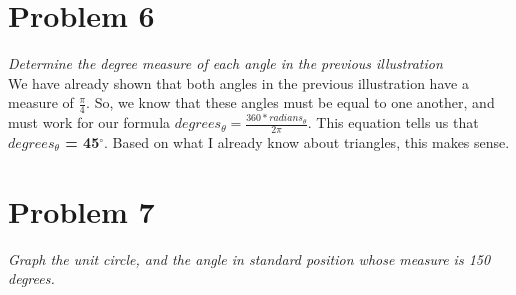 \documentclass[11pt]{article} %
\newcommand\tab[1][1cm]{\hspace*{#1}}
\begin{document}
\section{Problem 6}
\textit{Determine the degree measure of each angle in the previous illustration}
\\
\tab We have already shown that both angles in the previous illustration have a measure of $\frac{\pi}{4}$. So, we know that these angles must be equal to one another, and must work for our formula $degrees_\theta = \frac{360*radians_\theta}{2\pi}$. This equation tells us that \textbf{$degrees_\theta$ = 45$^{\circ}$}. Based on what I already know about triangles, this makes sense. 

\section{Problem 7}
\textit{Graph the unit circle, and the angle in standard position whose measure is 150 degrees.}
\end{document}
